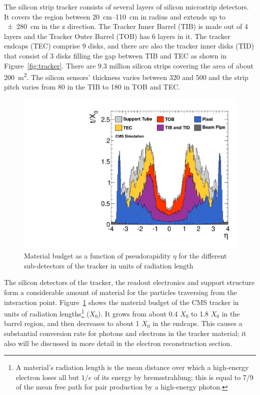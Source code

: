 The silicon strip tracker consists of several layers of silicon microstrip detectors. It covers the region between
\SIrange{20}{110}{\cm} in radius and extends up to \SI{+-280}{\cm} in the z direction. The Tracker Inner Barrel (TIB) is
made out of 4 layers and the Tracker Outer Barrel (TOB) has 6 layers in it. The tracker endcaps (TEC) comprise 9 disks,
and there are also the tracker inner disks (TID) that consist of 3 disks filling the gap between TIB and TEC as shown in
Figure~\ref{fig:tracker}. There are \num{9.3} million silicon strips covering the area of about \SI{200}{\m\squared}.
The silicon sensors' thickness varies between \num{320} and \SI{500}{\micron} and the strip pitch varies from
\SI{80}{\micron} in the TIB to \SI{180}{\micron} in TOB and TEC.

\begin{figure}[!htbp]
  \centering
  \leavevmode
  \includegraphics[width=0.6\columnwidth]{tracker_material_budget}
  \caption[Material budget as a function of pseudorapidity $\eta$ for the different sub-detectors of the
  tracker]{Material budget as a function of pseudorapidity $\eta$ for the different sub-detectors of the tracker in
  units of radiation length \autocite{CMS_tracker_twiki}}
  \label{fig:tracker_material_budget}
\end{figure}

The silicon detectors of the tracker, the readout electronics and support structure form a considerable amount of
material for the particles traversing from the interaction point. Figure~\ref{fig:tracker_material_budget}
\autocite{CMS} shows the material budget of the CMS tracker in units of radiation lengths\footnote{A material's
radiation length is the mean distance over which a high-energy electron loses all but $1/e$ of its energy by
bremsstrahlung; this is equal to \num{7/9} of the mean free path for pair production by a high-energy photon.} ($X_0$).
It grows from about \num{0.4} $X_0$ to \num{1.8} $X_0$ in the barrel region, and then decreases to about \num{1} $X_0$
in the endcaps. This causes a substantial conversion rate for photons and electrons in the tracker material; it also
will be discussed in more detail in the electron reconstruction section.

